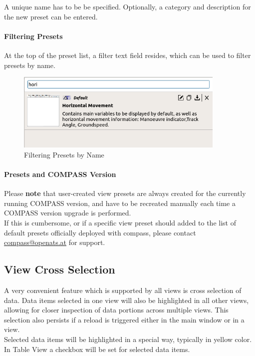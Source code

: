 A unique name has to be be specified. Optionally, a category and description for the new preset can be entered.

\paragraph*{Filtering Presets} At the top of the preset list, a filter text field resides, which can be used to filter presets by name.

\begin{figure}[H]
    \center
    \includegraphics[width=10cm]{figures/view_preset_filter.png}
  \caption{Filtering Presets by Name}
\end{figure}

\paragraph*{Presets and COMPASS Version}

Please \textbf{note} that user-created view presets are always created for the currently running COMPASS version, 
and have to be recreated manually each time a COMPASS version upgrade is performed. \\

If this is cumbersome, or if a specific view preset should added to the list of default presets officially deployed with compass, 
please contact \href{mailto:compass@openats.at}{compass@openats.at} for support.

\subsection{View Cross Selection}

A very convenient feature which is supported by all views is cross selection of data. Data items selected in one view will also be highlighted in all other views, 
allowing for closer inspection of data portions across multiple views. This selection also persists if a reload is triggered either in the main window or in a view. \\

Selected data items will be highlighted in a special way, typically in yellow color. In Table View a checkbox will be set for selected data items.

